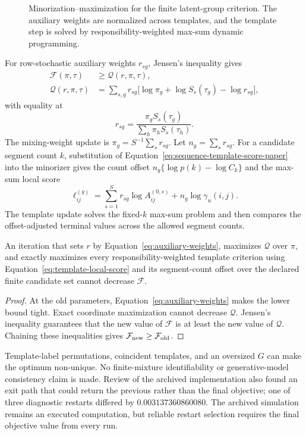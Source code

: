 \begin{figure}[t]
  \centering
  \resizebox{0.84\textwidth}{!}{}
  \caption{Minorization--maximization for the finite latent-group criterion. The auxiliary weights are normalized across templates, and the template step is solved by responsibility-weighted max-sum dynamic programming.}
  \label{fig:latent-group-paper}
\end{figure}

For row-stochastic auxiliary weights $r_{sg}$, Jensen's inequality gives
\begin{align}
\mathcal F(\pi,\tau)&\ge\mathcal Q(r,\pi,\tau),\nonumber\\
\mathcal Q(r,\pi,\tau)
&=\sum_{s,g}r_{sg}\bigl[\log\pi_g+\log S_s(\tau_g)-\log r_{sg}\bigr],
\label{eq:latent-group-bound}
\end{align}
with equality at
\begin{equation}
 r_{sg}=\frac{\pi_gS_s(\tau_g)}{\sum_h\pi_hS_s(\tau_h)}.
\label{eq:auxiliary-weights}
\end{equation}
The mixing-weight update is $\pi_g=S^{-1}\sum_s r_{sg}$. Let $n_g=\sum_s r_{sg}$. For a candidate segment count $k$, substitution of Equation~\eqref{eq:sequence-template-score-paper} into the minorizer gives the count offset $n_g\{\log p(k)-\log C_k\}$ and the max-sum local score
\begin{equation}
\ell^{(g)}_{ij}=\sum_{s=1}^{S}r_{sg}\log A^{(0,s)}_{ij}
                  +n_g\log\gamma_u(i,j).
\label{eq:template-local-score}
\end{equation}
The template update solves the fixed-$k$ max-sum problem and then compares the offset-adjusted terminal values across the allowed segment counts.

\begin{theorem}
\label{thm:template-monotonicity-paper}
An iteration that sets $r$ by Equation~\eqref{eq:auxiliary-weights}, maximizes $\mathcal Q$ over $\pi$, and exactly maximizes every responsibility-weighted template criterion using Equation~\eqref{eq:template-local-score} and its segment-count offset over the declared finite candidate set cannot decrease $\mathcal F$.
\end{theorem}
\begin{proof}
At the old parameters, Equation~\eqref{eq:auxiliary-weights} makes the lower bound tight. Exact coordinate maximization cannot decrease $\mathcal Q$. Jensen's inequality guarantees that the new value of $\mathcal F$ is at least the new value of $\mathcal Q$. Chaining these inequalities gives $\mathcal F_{\rm new}\ge\mathcal F_{\rm old}$.
\end{proof}

Template-label permutations, coincident templates, and an oversized $G$ can make the optimum non-unique. No finite-mixture identifiability or generative-model consistency claim is made. Review of the archived implementation also found an exit path that could return the previous rather than the final objective; one of three diagnostic restarts differed by $0.003137360860080$. The archived simulation remains an executed computation, but reliable restart selection requires the final objective value from every run.
